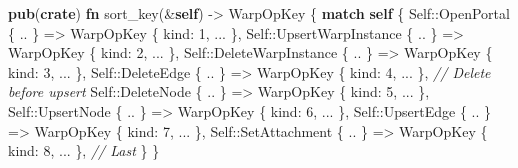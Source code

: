 \documentclass[
]{book}
\newenvironment{Shaded}{}{}
\newcommand{\CommentTok}[1]{\textcolor[rgb]{0.38,0.63,0.69}{\textit{#1}}}
\newcommand{\ControlFlowTok}[1]{\textcolor[rgb]{0.00,0.44,0.13}{\textbf{#1}}}
\newcommand{\DataTypeTok}[1]{\textcolor[rgb]{0.56,0.13,0.00}{#1}}
\newcommand{\DecValTok}[1]{\textcolor[rgb]{0.25,0.63,0.44}{#1}}
\newcommand{\KeywordTok}[1]{\textcolor[rgb]{0.00,0.44,0.13}{\textbf{#1}}}
\newcommand{\NormalTok}[1]{#1}
\newcommand{\OperatorTok}[1]{\textcolor[rgb]{0.40,0.40,0.40}{#1}}
\newcommand{\PreprocessorTok}[1]{\textcolor[rgb]{0.74,0.48,0.00}{#1}}
\begin{document}
\begin{Shaded}
\begin{Highlighting}[]
\KeywordTok{pub}\NormalTok{(}\KeywordTok{crate}\NormalTok{) }\KeywordTok{fn}\NormalTok{ sort\_key(}\OperatorTok{\&}\KeywordTok{self}\NormalTok{) }\OperatorTok{{-}\textgreater{}}\NormalTok{ WarpOpKey }\OperatorTok{\{}
    \ControlFlowTok{match} \KeywordTok{self} \OperatorTok{\{}
        \DataTypeTok{Self}\PreprocessorTok{::}\NormalTok{OpenPortal }\OperatorTok{\{} \OperatorTok{..} \OperatorTok{\}}        \OperatorTok{=\textgreater{}}\NormalTok{ WarpOpKey }\OperatorTok{\{}\NormalTok{ kind}\OperatorTok{:} \DecValTok{1}\OperatorTok{,} \OperatorTok{...} \OperatorTok{\},}
        \DataTypeTok{Self}\PreprocessorTok{::}\NormalTok{UpsertWarpInstance }\OperatorTok{\{} \OperatorTok{..} \OperatorTok{\}} \OperatorTok{=\textgreater{}}\NormalTok{ WarpOpKey }\OperatorTok{\{}\NormalTok{ kind}\OperatorTok{:} \DecValTok{2}\OperatorTok{,} \OperatorTok{...} \OperatorTok{\},}
        \DataTypeTok{Self}\PreprocessorTok{::}\NormalTok{DeleteWarpInstance }\OperatorTok{\{} \OperatorTok{..} \OperatorTok{\}} \OperatorTok{=\textgreater{}}\NormalTok{ WarpOpKey }\OperatorTok{\{}\NormalTok{ kind}\OperatorTok{:} \DecValTok{3}\OperatorTok{,} \OperatorTok{...} \OperatorTok{\},}
        \DataTypeTok{Self}\PreprocessorTok{::}\NormalTok{DeleteEdge }\OperatorTok{\{} \OperatorTok{..} \OperatorTok{\}}        \OperatorTok{=\textgreater{}}\NormalTok{ WarpOpKey }\OperatorTok{\{}\NormalTok{ kind}\OperatorTok{:} \DecValTok{4}\OperatorTok{,} \OperatorTok{...} \OperatorTok{\},}  \CommentTok{// Delete before upsert}
        \DataTypeTok{Self}\PreprocessorTok{::}\NormalTok{DeleteNode }\OperatorTok{\{} \OperatorTok{..} \OperatorTok{\}}        \OperatorTok{=\textgreater{}}\NormalTok{ WarpOpKey }\OperatorTok{\{}\NormalTok{ kind}\OperatorTok{:} \DecValTok{5}\OperatorTok{,} \OperatorTok{...} \OperatorTok{\},}
        \DataTypeTok{Self}\PreprocessorTok{::}\NormalTok{UpsertNode }\OperatorTok{\{} \OperatorTok{..} \OperatorTok{\}}        \OperatorTok{=\textgreater{}}\NormalTok{ WarpOpKey }\OperatorTok{\{}\NormalTok{ kind}\OperatorTok{:} \DecValTok{6}\OperatorTok{,} \OperatorTok{...} \OperatorTok{\},}
        \DataTypeTok{Self}\PreprocessorTok{::}\NormalTok{UpsertEdge }\OperatorTok{\{} \OperatorTok{..} \OperatorTok{\}}        \OperatorTok{=\textgreater{}}\NormalTok{ WarpOpKey }\OperatorTok{\{}\NormalTok{ kind}\OperatorTok{:} \DecValTok{7}\OperatorTok{,} \OperatorTok{...} \OperatorTok{\},}
        \DataTypeTok{Self}\PreprocessorTok{::}\NormalTok{SetAttachment }\OperatorTok{\{} \OperatorTok{..} \OperatorTok{\}}     \OperatorTok{=\textgreater{}}\NormalTok{ WarpOpKey }\OperatorTok{\{}\NormalTok{ kind}\OperatorTok{:} \DecValTok{8}\OperatorTok{,} \OperatorTok{...} \OperatorTok{\},}  \CommentTok{// Last}
    \OperatorTok{\}}
\OperatorTok{\}}
\end{Highlighting}
\end{Shaded}
\end{document}
